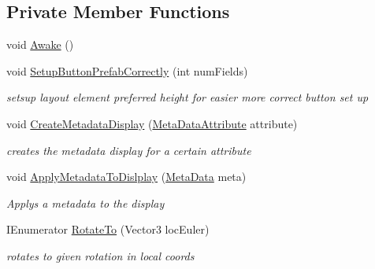 \subsection*{Private Member Functions}
\begin{DoxyCompactItemize}
\item 
void \mbox{\hyperlink{class_meta_data_display_a45d9e14c784a8526dafd62f8efec02a7}{Awake}} ()
\item 
void \mbox{\hyperlink{class_meta_data_display_a1f06c004b7d217cbf4075b0b8eb1650e}{Setup\+Button\+Prefab\+Correctly}} (int num\+Fields)
\begin{DoxyCompactList}\small\item\em setsup layout element preferred height for easier more correct button set up \end{DoxyCompactList}\item 
void \mbox{\hyperlink{class_meta_data_display_a9306b452a284969cbca1414a034eb5c9}{Create\+Metadata\+Display}} (\mbox{\hyperlink{class_meta_data_attribute}{Meta\+Data\+Attribute}} attribute)
\begin{DoxyCompactList}\small\item\em creates the metadata display for a certain attribute \end{DoxyCompactList}\item 
void \mbox{\hyperlink{class_meta_data_display_ab982cb6123576aff6eae89a859899ad0}{Apply\+Metadata\+To\+Dislplay}} (\mbox{\hyperlink{class_meta_data}{Meta\+Data}} meta)
\begin{DoxyCompactList}\small\item\em Applys a metadata to the display \end{DoxyCompactList}\item 
I\+Enumerator \mbox{\hyperlink{class_meta_data_display_adee283ec76c3631bf535ae3e5071090b}{Rotate\+To}} (Vector3 loc\+Euler)
\begin{DoxyCompactList}\small\item\em rotates to given rotation in local coords \end{DoxyCompactList}\end{DoxyCompactItemize}
